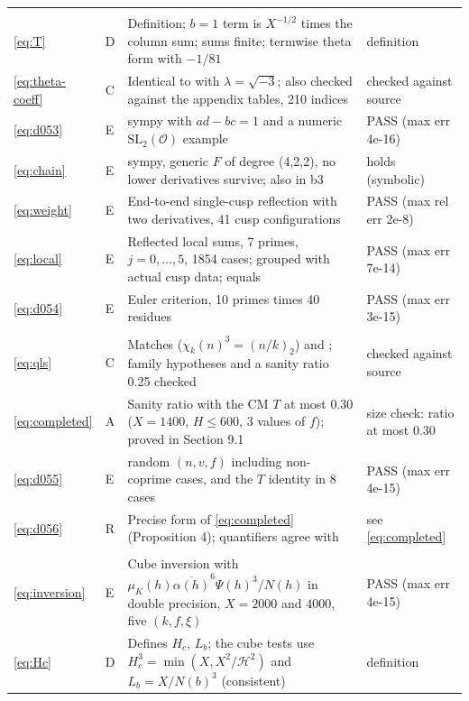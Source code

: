 \documentclass[11pt]{article}
\numberwithin{equation}{section}
\begin{document}
\begin{longtable}{@{}>{\raggedright\arraybackslash}p{1.2cm}>{\centering\arraybackslash}p{0.7cm}>{\raggedright\arraybackslash}p{9.05cm}>{\raggedright\arraybackslash}p{4.3cm}@{}}
\multicolumn{4}{@{}l}{\emph{Section~8}}\\
\eqref{eq:T} & D & Definition; $b=1$ term is $X^{-1/2}$ times the column sum; sums finite; termwise theta form with $-1/81$ & definition\\
\eqref{eq:theta-coeff} & C & Identical to \cite[Corollary~24(2)]{QF} with $\lambda=\sqrt{-3}$; also checked against the appendix tables, 210 indices & checked against source\\
\eqref{eq:d053} & E & sympy with $ad-bc=1$ and a numeric $\mathrm{SL}_2(\mathcal O)$ example & PASS (max err 4e-16)\\
\eqref{eq:chain} & E & sympy, generic $F$ of degree (4,2,2), no lower derivatives survive; also in b3 & holds (symbolic)\\
\eqref{eq:weight} & E & End-to-end single-cusp reflection with two derivatives, 41 cusp configurations & PASS (max rel err 2e-8)\\
\eqref{eq:local} & E & Reflected local sums, 7 primes, $j=0,\dots,5$, 1854 cases; grouped with actual cusp data; equals \cite[(6.5)]{OAI1112} & PASS (max err 7e-14)\\
\eqref{eq:d054} & E & Euler criterion, 10 primes times 40 residues & PASS (max err 3e-15)\\
\multicolumn{4}{@{}l}{\emph{Section~9}}\\
\eqref{eq:qls} & C & Matches \cite[Lemma~6.5]{OAI1112} ($\chi_k(n)^3=(n/k)_2$) and \cite[Theorem~1.1]{GL}; family hypotheses and a sanity ratio 0.25 checked & checked against source\\
\eqref{eq:completed} & A & Sanity ratio with the CM $T$ at most 0.30 ($X=1400$, $H\le600$, 3 values of $f$); proved in Section 9.1 & size check: ratio at most 0.30\\
\eqref{eq:d055} & E & 400 random $(n,v,f)$ including non-coprime cases, and the $T$ identity in 8 cases & PASS (max err 4e-15)\\
\eqref{eq:d056} & R & Precise form of \eqref{eq:completed} (Proposition 4); quantifiers agree with \cite[Proposition~5.2]{OAI1112} & see \eqref{eq:completed}\\
\multicolumn{4}{@{}l}{\emph{Section~10}}\\
\eqref{eq:inversion} & E & Cube inversion with $\mu_K(h)\overline{\alpha(h)}^6\Psi(h)^3/N(h)$ in double precision, $X=2000$ and $4000$, five $(k,f,\xi)$ & PASS (max err 4e-15)\\
\eqref{eq:Hc} & D & Defines $H_c$, $L_b$; the cube tests use $H_c^3=\min(X,X^2/\mathcal H^2)$ and $L_b=X/N(b)^3$ (consistent) & definition\\

\end{longtable}
\end{document}
